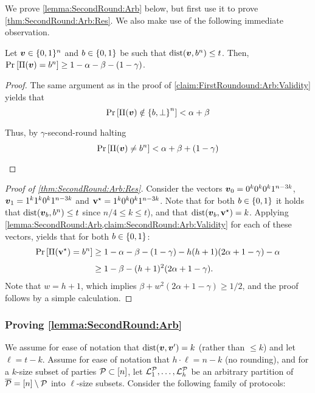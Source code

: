 We prove \cref{lemma:SecondRound:Arb} below, but first use it to prove \cref{thm:SecondRound:Arb:Res}. We also make use of the following immediate observation.
\begin{claim}\label{claim:SecondRound:Arb:Validity}
Let ${ \boldsymbol{v}} \in {\{0,1\}^n}$ and $b \in \{0,1\}$ be such that $\mathrm{dist}({ \boldsymbol{v}},b^n) \le t$. Then, $\Pr_{}\left[\Pi({ \boldsymbol{v}}) = b^n \right] \ge 1 - \alpha - \beta - (1- \gamma)$.
\end{claim}
\begin{proof}
The same argument as in the proof of \cref{claim:FirstRoundound:Arb:Validity} yields that
\begin{align*}
\Pr_{}\left[\Pi({ \boldsymbol{v}}) \notin \left\{b,\bot\right\}^n\right] < \alpha + \beta
\end{align*}
Thus, by $\gamma$-second-round halting
\begin{align*}
\Pr_{}\left[\Pi({ \boldsymbol{v}}) \ne b^n\right] < \alpha + \beta + (1-\gamma)
\end{align*}
\end{proof}

\begin{proof}[Proof of \cref{thm:SecondRound:Arb:Res}]
Consider the vectors ${ \boldsymbol{v}}_0= 0^k 0^k 0^k 1^{n-3k}$, ${ \boldsymbol{v}}_1= 1^k 1^k 0^k 1^{n-3k}$ and $\mathbf{v}^{\star} =1^k 0^k 0^k 1^{n-3k}$. Note that for both $b\in \{0,1\}$ it holds that $\mathrm{dist}({ \boldsymbol{v}}_b,b^n)\le t$ since $n/4 \leq k\leq t$), and that $\mathrm{dist}({ \boldsymbol{v}}_b,\mathbf{v}^{\star})=k$. Applying \cref{lemma:SecondRound:Arb,claim:SecondRound:Arb:Validity} for each of these vectors, yields that for both $b\in \{0,1\}$:
\begin{align*}
\Pr_{}\left[\Pi(\mathbf{v}^{\star}) = b^n\right] &\ge 1- \alpha - \beta -(1- \gamma) - h(h+1)(2\alpha + 1-\gamma) -\alpha\\
&\ge 1- \beta - (h+1)^2(2\alpha + 1-\gamma).
\end{align*}
Note that $w=h+1$, which implies $\beta +w^2(2\alpha + 1-\gamma) \ge 1/2$, and the proof follows by a simple calculation.
\end{proof}

\subsubsection{Proving \cref{lemma:SecondRound:Arb}}
We assume for ease of notation that $\mathrm{dist}({ \boldsymbol{v}},{ \boldsymbol{v}}')=k$ (rather than $\le k$) and let $\ell=t-k$. Assume for ease of notation that $h\cdot \ell = n-k $ (\ie no rounding), and for a $k$-size
subset of parties $\mathcal{P} \subset [n]$, let $ {\cal{L}}^{\mathcal{P}}_1,\dots,{\cal{L}}_h^{\mathcal{P}}$ be an arbitrary partition of ${\overline{\mathcal{P}}} = [n] \setminus \mathcal{P}$ into $\ell$-size
subsets. Consider the following family of protocols:


